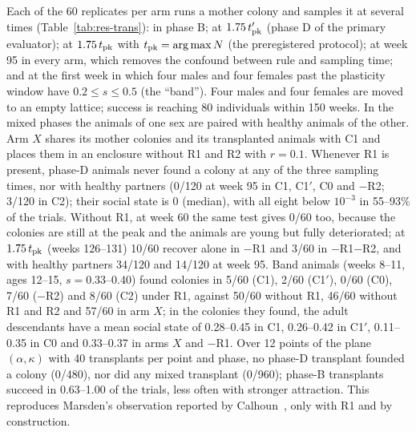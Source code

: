 \documentclass[pre,onecolumn,superscriptaddress,notitlepage]{revtex4-2}
\begin{document}
Each of the 60 replicates per arm runs a mother colony and samples it at several times (Table~\ref{tab:res-trans}):
in phase B; at $1.75\,t'_{\rm pk}$ (phase D of the primary evaluator); at $1.75\,t_{\rm pk}$ with
$t_{\rm pk}=\arg\max N$ (the preregistered protocol); at week 95 in every arm, which removes the confound between
rule and sampling time; and at the first week in which four males and four females past the plasticity window have
$0.2\le s\le0.5$ (the ``band''). Four males and four females are moved to an empty lattice; success is reaching 80
individuals within 150 weeks. In the mixed phases the animals of one sex are paired with healthy animals of the
other. Arm $X$ shares its mother colonies and its transplanted animals with \textsf{C1} and places them in an
enclosure without R1 and R2 with $r=0.1$. Whenever R1 is present, phase-D animals never found a colony at any of
the three sampling times, nor with healthy partners (0/120 at week 95 in \textsf{C1}, \textsf{C1}$'$, \textsf{C0}
and $-$R2; 3/120 in \textsf{C2}); their social state is 0 (median), with all eight below $10^{-3}$ in 55--93\% of the
trials. Without R1, at week 60 the same test gives 0/60 too, because the colonies are still at the peak and the
animals are young but fully deteriorated; at $1.75\,t_{\rm pk}$ (weeks 126--131) 10/60 recover alone in $-$R1 and
3/60 in $-$R1$-$R2, and with healthy partners 34/120 and 14/120 at week 95. Band animals (weeks 8--11, ages 12--15,
$s=0.33$--0.40) found colonies in 5/60 (\textsf{C1}), 2/60 (\textsf{C1}$'$), 0/60 (\textsf{C0}), 7/60 ($-$R2) and
8/60 (\textsf{C2}) under R1, against 50/60 without R1, 46/60 without R1 and R2 and 57/60 in arm $X$; in the colonies
they found, the adult descendants have a mean social state of 0.28--0.45 in \textsf{C1}, 0.26--0.42 in
\textsf{C1}$'$, 0.11--0.35 in \textsf{C0} and 0.33--0.37 in arms $X$ and $-$R1. Over 12 points of the plane
$(\alpha,\kappa)$ with 40 transplants per point and phase, no phase-D transplant founded a colony (0/480), nor did
any mixed transplant (0/960); phase-B transplants succeed in 0.63--1.00 of the trials, less often with stronger
attraction. This reproduces Marsden's observation reported by Calhoun~\cite{Calhoun1973,Marsden1972}, only with R1
and by construction.
\end{document}
